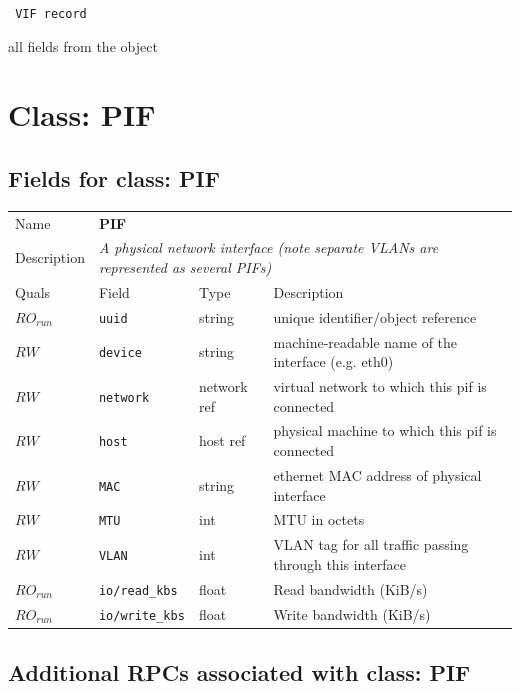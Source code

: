 \vspace{0.3cm}

{\tt 
VIF record
}


all fields from the object
\vspace{0.3cm}
\vspace{0.3cm}
\vspace{0.3cm}

\vspace{1cm}
\newpage
\section{Class: PIF}
\subsection{Fields for class: PIF}
\begin{longtable}{|lllp{}|}
\hline
\multicolumn{1}{|l}{Name} & \multicolumn{3}{l|}{\bf PIF} \\
\multicolumn{1}{|l}{Description} & \multicolumn{3}{l|}{\parbox{11cm}{\em A
physical network interface (note separate VLANs are represented as several
PIFs)}} \\
\hline
Quals & Field & Type & Description \\
\hline
$\mathit{RO}_\mathit{run}$ &  {\tt uuid} & string & unique identifier/object reference \\
$\mathit{RW}$ &  {\tt device} & string & machine-readable name of the interface (e.g. eth0) \\
$\mathit{RW}$ &  {\tt network} & network ref & virtual network to which this pif is connected \\
$\mathit{RW}$ &  {\tt host} & host ref & physical machine to which this pif is connected \\
$\mathit{RW}$ &  {\tt MAC} & string & ethernet MAC address of physical interface \\
$\mathit{RW}$ &  {\tt MTU} & int & MTU in octets \\
$\mathit{RW}$ &  {\tt VLAN} & int & VLAN tag for all traffic passing through this interface \\
$\mathit{RO}_\mathit{run}$ &  {\tt io/read\_kbs} & float & Read bandwidth (KiB/s) \\
$\mathit{RO}_\mathit{run}$ &  {\tt io/write\_kbs} & float & Write bandwidth (KiB/s) \\
\hline
\end{longtable}
\subsection{Additional RPCs associated with class: PIF}
